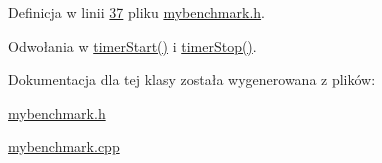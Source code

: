 Definicja w linii \hyperlink{mybenchmark_8h_source_l00037}{37} pliku \hyperlink{mybenchmark_8h_source}{mybenchmark.\-h}.



Odwołania w \hyperlink{mybenchmark_8cpp_source_l00035}{timer\-Start()} i \hyperlink{mybenchmark_8cpp_source_l00040}{timer\-Stop()}.



Dokumentacja dla tej klasy została wygenerowana z plików\-:\begin{DoxyCompactItemize}
\item 
\hyperlink{mybenchmark_8h}{mybenchmark.\-h}\item 
\hyperlink{mybenchmark_8cpp}{mybenchmark.\-cpp}\end{DoxyCompactItemize}
